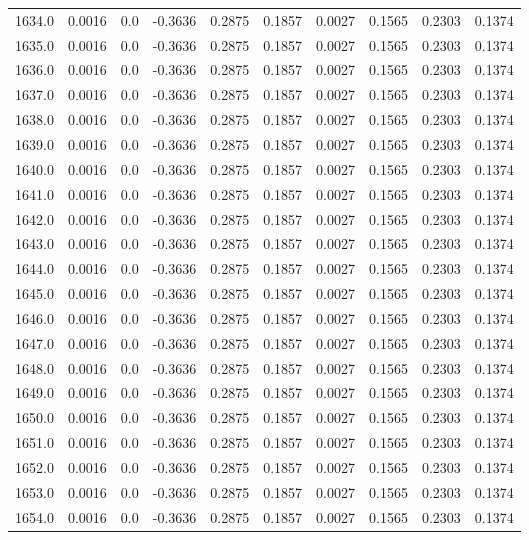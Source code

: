 \begin{longtable}{lrrrrrrrrr}
1634.0 & 0.0016 & 0.0 & -0.3636 & 0.2875 & 0.1857 & 0.0027 & 0.1565 & 0.2303 & 0.1374 \\
1635.0 & 0.0016 & 0.0 & -0.3636 & 0.2875 & 0.1857 & 0.0027 & 0.1565 & 0.2303 & 0.1374 \\
1636.0 & 0.0016 & 0.0 & -0.3636 & 0.2875 & 0.1857 & 0.0027 & 0.1565 & 0.2303 & 0.1374 \\
1637.0 & 0.0016 & 0.0 & -0.3636 & 0.2875 & 0.1857 & 0.0027 & 0.1565 & 0.2303 & 0.1374 \\
1638.0 & 0.0016 & 0.0 & -0.3636 & 0.2875 & 0.1857 & 0.0027 & 0.1565 & 0.2303 & 0.1374 \\
1639.0 & 0.0016 & 0.0 & -0.3636 & 0.2875 & 0.1857 & 0.0027 & 0.1565 & 0.2303 & 0.1374 \\
1640.0 & 0.0016 & 0.0 & -0.3636 & 0.2875 & 0.1857 & 0.0027 & 0.1565 & 0.2303 & 0.1374 \\
1641.0 & 0.0016 & 0.0 & -0.3636 & 0.2875 & 0.1857 & 0.0027 & 0.1565 & 0.2303 & 0.1374 \\
1642.0 & 0.0016 & 0.0 & -0.3636 & 0.2875 & 0.1857 & 0.0027 & 0.1565 & 0.2303 & 0.1374 \\
1643.0 & 0.0016 & 0.0 & -0.3636 & 0.2875 & 0.1857 & 0.0027 & 0.1565 & 0.2303 & 0.1374 \\
1644.0 & 0.0016 & 0.0 & -0.3636 & 0.2875 & 0.1857 & 0.0027 & 0.1565 & 0.2303 & 0.1374 \\
1645.0 & 0.0016 & 0.0 & -0.3636 & 0.2875 & 0.1857 & 0.0027 & 0.1565 & 0.2303 & 0.1374 \\
1646.0 & 0.0016 & 0.0 & -0.3636 & 0.2875 & 0.1857 & 0.0027 & 0.1565 & 0.2303 & 0.1374 \\
1647.0 & 0.0016 & 0.0 & -0.3636 & 0.2875 & 0.1857 & 0.0027 & 0.1565 & 0.2303 & 0.1374 \\
1648.0 & 0.0016 & 0.0 & -0.3636 & 0.2875 & 0.1857 & 0.0027 & 0.1565 & 0.2303 & 0.1374 \\
1649.0 & 0.0016 & 0.0 & -0.3636 & 0.2875 & 0.1857 & 0.0027 & 0.1565 & 0.2303 & 0.1374 \\
1650.0 & 0.0016 & 0.0 & -0.3636 & 0.2875 & 0.1857 & 0.0027 & 0.1565 & 0.2303 & 0.1374 \\
1651.0 & 0.0016 & 0.0 & -0.3636 & 0.2875 & 0.1857 & 0.0027 & 0.1565 & 0.2303 & 0.1374 \\
1652.0 & 0.0016 & 0.0 & -0.3636 & 0.2875 & 0.1857 & 0.0027 & 0.1565 & 0.2303 & 0.1374 \\
1653.0 & 0.0016 & 0.0 & -0.3636 & 0.2875 & 0.1857 & 0.0027 & 0.1565 & 0.2303 & 0.1374 \\
1654.0 & 0.0016 & 0.0 & -0.3636 & 0.2875 & 0.1857 & 0.0027 & 0.1565 & 0.2303 & 0.1374 \\

\end{longtable}
